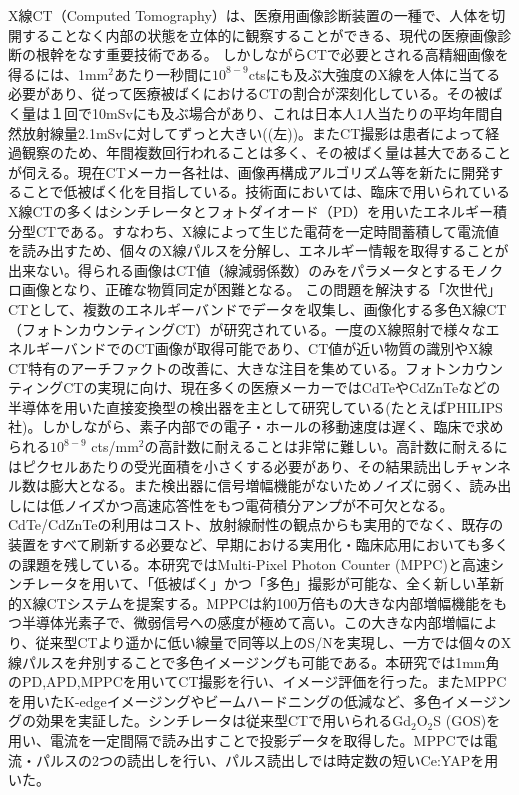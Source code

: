 \begin{jabstract}
X線CT（Computed Tomography）は、医療用画像診断装置の一種で、人体を切開することなく内部の状態を立体的に観察することができる、現代の医療画像診断の根幹をなす重要技術である。
しかしながらCTで必要とされる高精細画像を得るには、1mm$^2$あたり一秒間に$10^{8-9}$ctsにも及ぶ大強度のX線を人体に当てる必要があり、従って医療被ばくにおけるCTの割合が深刻化している。その被ばく量は１回で10mSvにも及ぶ場合があり、これは日本人1人当たりの平均年間自然放射線量2.1mSvに対してずっと大きい((左))。またCT撮影は患者によって経過観察のため、年間複数回行われることは多く、その被ばく量は甚大であることが伺える。現在CTメーカー各社は、画像再構成アルゴリズム等を新たに開発することで低被ばく化を目指している。技術面においては、臨床で用いられているX線CTの多くはシンチレータとフォトダイオード（PD）を用いたエネルギー積分型CTである。すなわち、X線によって生じた電荷を一定時間蓄積して電流値を読み出すため、個々のX線パルスを分解し、エネルギー情報を取得することが出来ない。得られる画像はCT値（線減弱係数）のみをパラメータとするモノクロ画像となり、正確な物質同定が困難となる。
この問題を解決する「次世代」CTとして、複数のエネルギーバンドでデータを収集し、画像化する多色X線CT（フォトンカウンティングCT）が研究されている。一度のX線照射で様々なエネルギーバンドでのCT画像が取得可能であり、CT値が近い物質の識別やX線CT特有のアーチファクトの改善に、大きな注目を集めている。フォトンカウンティングCTの実現に向け、現在多くの医療メーカーではCdTeやCdZnTeなどの半導体を用いた直接変換型の検出器を主として研究している(たとえばPHILIPS社)。しかしながら、素子内部での電子・ホールの移動速度は遅く、臨床で求められる$10^{8-9}$ cts/mm$^2$の高計数に耐えることは非常に難しい。高計数に耐えるにはピクセルあたりの受光面積を小さくする必要があり、その結果読出しチャンネル数は膨大となる。また検出器に信号増幅機能がないためノイズに弱く、読み出しには低ノイズかつ高速応答性をもつ電荷積分アンプが不可欠となる。CdTe/CdZnTeの利用はコスト、放射線耐性の観点からも実用的でなく、既存の装置をすべて刷新する必要など、早期における実用化・臨床応用においても多くの課題を残している。本研究ではMulti-Pixel Photon Counter (MPPC)と高速シンチレータを用いて、「低被ばく」かつ「多色」撮影が可能な、全く新しい革新的X線CTシステムを提案する。MPPCは約100万倍もの大きな内部増幅機能をもつ半導体光素子で、微弱信号への感度が極めて高い。この大きな内部増幅により、従来型CTより遥かに低い線量で同等以上のS/Nを実現し、一方では個々のX線パルスを弁別することで多色イメージングも可能である。本研究では1mm角のPD,APD,MPPCを用いてCT撮影を行い、イメージ評価を行った。またMPPCを用いたK-edgeイメージングやビームハードニングの低減など、多色イメージングの効果を実証した。シンチレータは従来型CTで用いられるGd$_2$O$_2$S (GOS)を用い、電流を一定間隔で読み出すことで投影データを取得した。MPPCでは電流・パルスの2つの読出しを行い、パルス読出しでは時定数の短いCe:YAPを用いた。
\end{jabstract}
